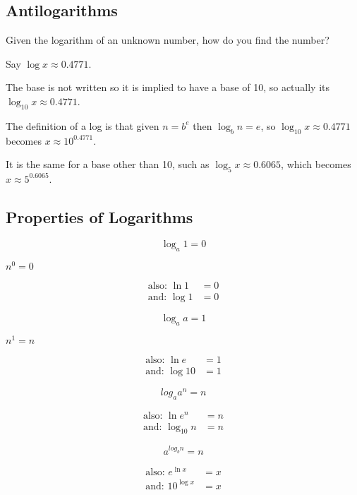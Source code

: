\documentclass{article}
\begin{document}
\subsection{Antilogarithms}
Given the logarithm of an unknown number, how do you find the number? 

Say $\log{x}\approx0.4771$.

The base is not written so it is implied to have a base of 10, so actually its $\log_10{x}\approx0.4771$.

The definition of a log is that given $n = b^e$ then $\log_b{n}=e$,
so $\log_10{x}\approx0.4771$ becomes $x\approx10^{0.4771}$.

It is the same for a base other than 10, such as $\log_5{x}\approx0.6065$, which becomes $x\approx5^{0.6065}$.

\subsection{Properties of Logarithms}

\begin{Large}
$$\log_a{1}=0$$
\end{Large}
\begin{center}
$n^0=0$
\end{center}
\begin{align*}
\text{also: }\ln{1}&=0\\
\text{and: }\log{1}&=0
\end{align*}

\begin{Large}
$$\log_a{a}=1$$
\end{Large}
\begin{center}
$n^1=n$\\
\end{center}

\begin{align*}
\text{also: }\ln{e}&=1\\
\text{and: }\log{10}&=1
\end{align*}

\begin{Large}
$$log_a{a^n}=n$$
\end{Large}
\begin{align*}
\text{also: }\ln{e^n}&=n\\
\text{and: }\log_10{n}&=n
\end{align*}

\begin{Large}
$$a^{log_b{n}}=n$$
\end{Large}
\begin{align*}
\text{also: }e^{\ln{x}}&=x\\
\text{and: }10^{\log{x}}&=x
\end{align*}
\end{document}
